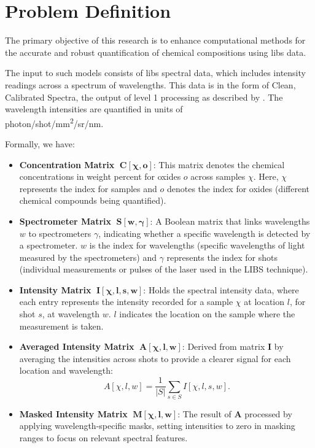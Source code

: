 \section{Problem Definition}\label{sec:problem_definition}
The primary objective of this research is to enhance computational methods for the accurate and robust quantification of chemical compositions using \gls{libs} data.

The input to such models consists of \gls{libs} spectral data, which includes intensity readings across a spectrum of wavelengths. This data is in the form of Clean, Calibrated Spectra\cite{andersonImprovedAccuracyQuantitative2017}, the output of level 1 processing as described by \citet{wiensPreflightCalibrationInitial2013}. The wavelength intensities are quantified in units of \\ photon/shot/mm\textsuperscript{2}/sr/nm.

Formally, we have:
\begin{itemize}[topsep=0pt]
    \item \textbf{Concentration Matrix} $\;\mathbf{C[\chi, o]}$: This matrix denotes the chemical concentrations in weight percent for oxides $o$ across samples $\chi$. Here, $\chi$ represents the index for samples and $o$ denotes the index for oxides (different chemical compounds being quantified).
    \label{matrix:concentration}

    \item \textbf{Spectrometer Matrix} $\;\mathbf{S[w, \gamma]}$: A Boolean matrix that links wavelengths $w$ to spectrometers $\gamma$, indicating whether a specific wavelength is detected by a spectrometer. $w$ is the index for wavelengths (specific wavelengths of light measured by the spectrometers) and $\gamma$ represents the index for shots (individual measurements or pulses of the laser used in the LIBS technique).
    \label{matrix:spectrometer}

    \item \textbf{Intensity Matrix} $\;\mathbf{I[\chi, l, s, w]}$: Holds the spectral intensity data, where each entry represents the intensity recorded for a sample $\chi$ at location $l$, for shot $s$, at wavelength $w$. $l$ indicates the location on the sample where the measurement is taken.
    \label{matrix:intensity}

    \item \textbf{Averaged Intensity Matrix} $\;\mathbf{A[\chi, l, w]}$: Derived from matrix $\mathbf{I}$ by averaging the intensities across shots to provide a clearer signal for each location and wavelength:
    \[
    A[\chi, l, w] = \frac{1}{|S|} \sum_{s \in S} I[\chi, l, s, w].
    \]
    \label{matrix:averaged_intensity}

    \item \textbf{Masked Intensity Matrix} $\;\mathbf{M[\chi, l, w]}$: The result of $\mathbf{A}$ processed by applying wavelength-specific masks, setting intensities to zero in masking ranges to focus on relevant spectral features.\label{matrix:masked_intensity}
\end{itemize}

